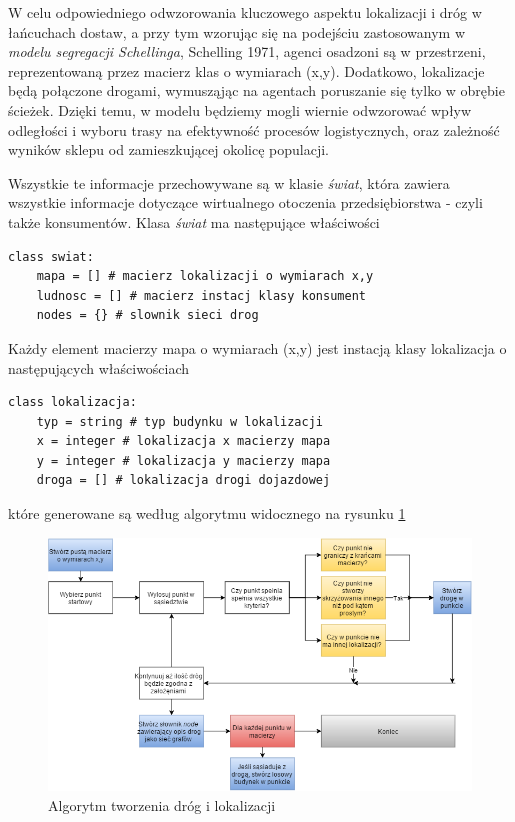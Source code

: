 \documentclass{article}
\begin{document}
W celu odpowiedniego odwzorowania kluczowego aspektu lokalizacji i dróg w łańcuchach dostaw, a przy tym wzorując się na podejściu zastosowanym w \textit{modelu segregacji Schellinga}, Schelling 1971, agenci osadzoni są w przestrzeni, reprezentowaną przez macierz klas o wymiarach (x,y). Dodatkowo, lokalizacje będą połączone drogami, wymusząjąc na agentach poruszanie się tylko w obrębie ścieżek. Dzięki temu, w modelu będziemy mogli wiernie odwzorować wpływ odległości i wyboru trasy na efektywność procesów logistycznych, oraz zależność wyników sklepu od zamieszkującej okolicę populacji.

Wszystkie te informacje przechowywane są w klasie \textit{świat}, która zawiera wszystkie informacje dotyczące wirtualnego otoczenia przedsiębiorstwa - czyli także konsumentów. Klasa \textit{świat} ma następujące właściwości

\begin{lstlisting}[frame=single]  
class swiat:   
	mapa = [] # macierz lokalizacji o wymiarach x,y
	ludnosc = [] # macierz instacj klasy konsument
	nodes = {} # slownik sieci drog
\end{lstlisting}


Każdy element macierzy mapa o wymiarach (x,y) jest instacją klasy lokalizacja o następujących właściwościach 

\begin{lstlisting}[frame=single]  
class lokalizacja:   
	typ = string # typ budynku w lokalizacji
	x = integer # lokalizacja x macierzy mapa
	y = integer # lokalizacja y macierzy mapa
	droga = [] # lokalizacja drogi dojazdowej

\end{lstlisting}



które generowane są według algorytmu widocznego na rysunku \ref{fig:lokalizacje}

\begin{figure}
  \centering
\includegraphics[width=\linewidth]{pictures/tworzeniedrog.png}
  \caption{Algorytm tworzenia dróg i lokalizacji}
  \label{fig:lokalizacje}
\end{figure}
\end{document}
